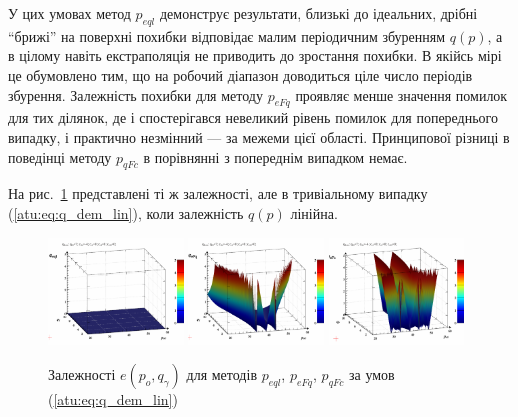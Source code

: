 У цих умовах метод
$ p_{eql} $ демонструє результати, близькі до ідеальних, дрібні
``брижі'' на поверхні похибки відповідає малим періодичним
збуренням
$q(p)$, а в цілому навіть екстраполяція не приводить до зростання
похибки. В якійсь мірі це обумовлено тим, що на робочий діапазон
доводиться ціле число періодів збурення. Залежність похибки
для методу
$ p_{eFq} $ проявляє менше значення помилок для тих ділянок, де
і спостерігався невеликий рівень помилок для попереднього
випадку, і практично незмінний --- за межеми цієї
області. Принципової різниці в поведінці методу
$ p_{qFc} $ в порівнянні з попереднім випадком немає.

На рис.~\ref{atu:f:qsl_pe_po_qg_lin} представлені ті ж залежності, але в
тривіальному випадку (\ref{atu:eq:q_dem_lin}), коли залежність
$q(p) $ лінійна.

\begin{figure}[htb!]
  \begin{center}
    \includegraphics[width=0.32\textwidth]{p/qls_pe-p_po_qg_eql_lin.png}
    \hfill
    \includegraphics[width=0.32\textwidth]{p/qls_pe-p_po_qg_eFq_lin.png}
    \hfill
    \includegraphics[width=0.32\textwidth]{p/qls_pe-p_po_qg_eFc_lin.png}
  \end{center}
  \caption{Залежності $e(p_o,q_\gamma)$ для методів $p_{eql}$, $p_{eFq}$, $p_{qFc}$ за умов (\ref{atu:eq:q_dem_lin})}
  \label{atu:f:qsl_pe_po_qg_lin}
\end{figure}

